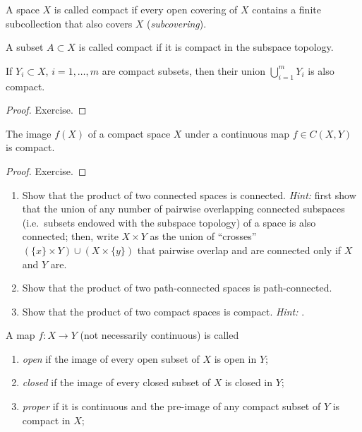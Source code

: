 \begin{defn}
A space $X$ is called compact if every open covering of $X$ contains a finite subcollection that also covers $X$ (\emph{subcovering}).
\end{defn}

\begin{defn}
A subset $A\subset X$ is called compact if it is compact in the subspace topology.
\end{defn}

\begin{prop}
If $Y_i\subset X$, $i = 1,\dots, m$ are compact subsets, then their union $\bigcup_{i=1}^m Y_i$ is also compact.
\end{prop}
\begin{proof}
Exercise.
\end{proof}

\begin{prop}\label{prop f(compact)=compact}
The image $f(X)$ of a compact space $X$ under a continuous map $f\in C(X,Y)$ is compact.
\end{prop}
\begin{proof}
Exercise.
\end{proof}

\begin{xca}
\begin{enumerate}
    \item Show that the product of two connected spaces is connected. \emph{Hint:} first show that the union of any number of pairwise overlapping connected subspaces (i.e.\ subsets endowed with the subspace topology) of a space is also connected; then, write $X\times Y$ as the union of ``crosses'' $(\{x\}\times Y)\cup (X\times \{y\})$ that pairwise overlap and are connected only if $X$ and $Y$ are.
    \item Show that the product of two path-connected spaces is path-connected.
    \item Show that the product of two compact spaces is compact. \emph{Hint:} \cite{compact.proof}.
\end{enumerate}
\end{xca}


\begin{defn}
A map $f:X\to Y$ (not necessarily continuous) is called
\begin{enumerate}
    \item \emph{open} if the image of every open subset of $X$ is open in $Y$;
    \item \emph{closed} if the image of every closed subset of $X$ is closed in $Y$;
    \item \emph{proper} if it is continuous and the pre-image of any compact subset of $Y$ is compact in $X$;
\end{enumerate}
\end{defn}

